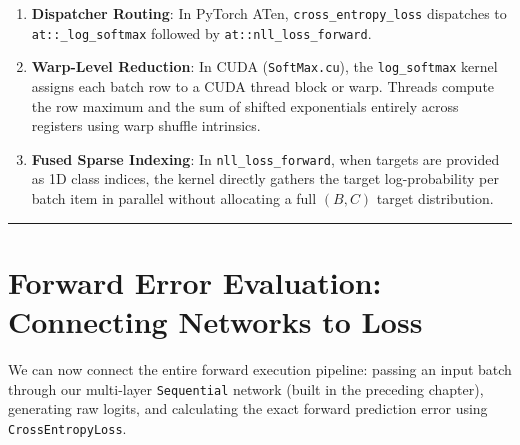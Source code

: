\documentclass[
  letterpaper,
]{scrbook}
\providecommand{\tightlist}{%
  \setlength{\itemsep}{0pt}\setlength{\parskip}{0pt}}
\begin{document}
\begin{enumerate}
\def\labelenumi{\arabic{enumi}.}
\tightlist
\item
  \textbf{Dispatcher Routing}: In PyTorch ATen,
  \texttt{cross\_entropy\_loss} dispatches to
  \texttt{at::\_log\_softmax} followed by
  \texttt{at::nll\_loss\_forward}.
\item
  \textbf{Warp-Level Reduction}: In CUDA (\texttt{SoftMax.cu}), the
  \texttt{log\_softmax} kernel assigns each batch row to a CUDA thread
  block or warp. Threads compute the row maximum and the sum of shifted
  exponentials entirely across registers using warp shuffle intrinsics.
\item
  \textbf{Fused Sparse Indexing}: In \texttt{nll\_loss\_forward}, when
  targets are provided as 1D class indices, the kernel directly gathers
  the target log-probability per batch item in parallel without
  allocating a full \((B, C)\) target distribution.
\end{enumerate}

\begin{center}\rule{0.5\linewidth}{0.5pt}\end{center}

\section{Forward Error Evaluation: Connecting Networks to
Loss}\label{forward-error-evaluation-connecting-networks-to-loss}

We can now connect the entire forward execution pipeline: passing an
input batch through our multi-layer \texttt{Sequential} network (built
in the preceding chapter), generating raw logits, and calculating the
exact forward prediction error using \texttt{CrossEntropyLoss}.
\end{document}
